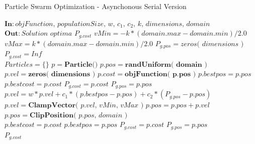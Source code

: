 \documentclass[journal,onecolumn]{IEEEtran}
\begin{document}
\begin{algorithm}[H]
    \caption{Particle Swarm Optimization - Asynchonous Serial Version}\label{alg:PSOcpu}
    \begin{algorithmic}[1]
        \State $\textbf{In}: \textit{objFunction, populationSize, w, $c_{1}$, $c_{2}$, k, dimensions, domain}$
        \State $\textbf{Out}: \textit{Solution optima } P_{g.cost}$
        \State $vMin = -k * ( domain.max - domain.min ) / 2.0$
        \State $vMax =  k * ( domain.max - domain.min ) / 2.0$
        \State $P_{g.pos} = \textit{zeros( dimensions )}$ 
        \State $P_{g.cost} = Inf$ 
        \\
        \State $Particles=\lbrace \rbrace$ 
         
            \State $p = \textbf{Particle()}$
            \State $p.pos = \textbf{randUniform( domain )}$
            \State $p.vel = \textbf{zeros( dimensions )}$
            \State $p.cost = \textbf{objFunction( p.pos )}$
            \State $p.bestpos = p.pos$
            \State $p.bestcost = p.cost$
                \State $P_{g.cost} = p.cost$
                \State $P_{g.pos} = p.pos$
            \EndIf
        \EndFor
        \\
         
                \State $p.vel = w * p.vel + 
                                c_{1} * ( p.bestpos - p.pos ) + 
                                c_{2} * ( P_{g.pos} - p.pos )$ 
                \State $p.vel = \textbf{ClampVector}\textit{( p.vel, vMin, vMax )}$
                \State $p.pos = p.pos + p.vel$ 
                \State $p.pos = \textbf{ClipPosition}\textit{( p.pos, domain )}$
                \\
                    \State $p.bestcost = p.cost$ 
                    \State $p.bestpos = p.pos$
                        \State $P_{g.cost} = p.cost$ 
                        \State $P_{g.pos} = p.pos$
                    \EndIf
                \EndIf
            \EndFor
        \EndWhile
        \\
        \Return $P_{g.cost}$
    \end{algorithmic}
\end{algorithm}
\end{document}
